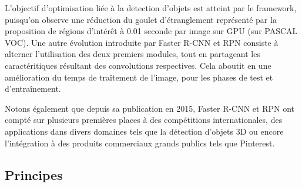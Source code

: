       L'objectif d'optimisation liée à la detection d'objets est atteint par le framework, 
      puisqu'on observe une réduction du goulet d'étranglement représenté par la proposition de régions d'intérêt à 0.01 seconde par image sur GPU (sur PASCAL VOC). 
      Une autre évolution introduite par Faster R-CNN et RPN consiste à alterner l'utilisation des deux premiers modules, tout en partageant les caractéritiques résultant des convolutions respectives. 
      Cela aboutit en une amélioration du temps de traîtement de l'image, pour les phases de test et d'entraînement. 
      
      Notons également que depuis sa publication en 2015, Faster R-CNN et RPN ont compté sur plusieurs premières places à des compétitions internationales, des applications dans divers domaines tels que la détection
      d'objets 3D ou encore l'intégration à des produits commerciaux grands publics tels que Pinterest. 
      
      \subsection{Principes}
      